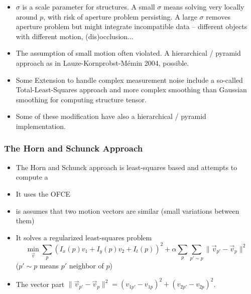 \documentclass[10pt]{beamer}
\newcommand{\myemph}[1]{{\color{blue}{#1}}}
\begin{document}
\begin{frame}
  \begin{itemize}
  \item $\sigma$ is a scale parameter for structures. A small $\sigma$ means
    solving very locally around $p$, with risk of aperture problem persisting. A large
    $\sigma$ removes aperture problem but might integrate incompatible data -- different
    objects with different motion, (dis)occlusion...
  \item The assumption of small motion often violated. A
     hierarchical / pyramid approach as in Lauze-Kornprobst-M{\'e}min 2004, possible.
  \item Some Extension to handle complex measurement noise include a so-called
    Total-Least-Squares approach and more complex smoothing than Gaussian smoothing for
    computing structure tensor.
  \item Some of these modification have also a hierarchical / pyramid implementation.
  \end{itemize}
\end{frame}


\begin{frame}
  \frametitle{The Horn and Schunck Approach}
  \begin{itemize}
  \item The Horn and Schunck approach is least-squares based and attempts to compute a
    \myemph{smooth motion vector field}
  \item It uses the OFCE
  \item is assumes that two motion vectors are similar (small variations between them)
  \item It solves a regularized least-squares problem
    $$
    \min_{\vec{v}}\sum_{p}\left(I_x(p)v_1+I_y(p)v_2+I_t(p)\right)^2 + \alpha\sum_{p}\sum_{p'\sim p}\|\vec{v}_{p'} - \vec{v}_p\|^2
    $$
    ($p'\sim p$ means $p'$ neighbor of $p$)

  \item The vector part $\|\vec{v}_{p'} - \vec{v}_p\|^2 = (v_{1p'}-v_{1p})^2 + (v_{2p'}-v_{2p})^2$.
  \end{itemize} 
\end{frame}
\end{document}
